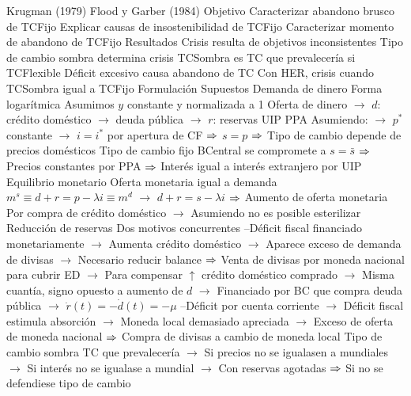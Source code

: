 \documentclass{nuevotema}
\begin{document}
\begin{esquemal}
				\4[] Krugman (1979)
				\4[] Flood y Garber (1984)
			\3 Objetivo
				\4 Caracterizar abandono brusco de TCFijo
				\4 Explicar causas de insostenibilidad de TCFijo
				\4 Caracterizar momento de abandono de TCFijo
			\3 Resultados
				\4 Crisis resulta de objetivos inconsistentes
				\4 Tipo de cambio sombra determina crisis
				\4[] TCSombra es TC que prevalecería si TCFlexible
				\4 Déficit excesivo causa abandono de TC
				\4 Con HER, crisis cuando TCSombra igual a TCFijo
		\2 Formulación
			\3 Supuestos
				\4 Demanda de dinero
				\4[] Forma logarítmica
				\4[] Asumimos $y$ constante y normalizada a 1
				\4[] 
				\4 Oferta de dinero
				\4[] 
				\4[] $\to$ $d$: crédito doméstico $\to$ deuda pública
				\4[] $\to$ $r$: reservas
				\4 UIP
				\4[] 
				\4 PPA
				\4[] 
				\4[] Asumiendo:
				\4[] $\to$ $p^*$ constante
				\4[] $\to$ $i = i^*$ por apertura de CF
				\4[] $\Rightarrow$ $s=p$
				\4[] $\Rightarrow$ Tipo de cambio depende de precios domésticos
				\4 Tipo de cambio fijo
				\4[] BCentral se compromete a $s = \bar{s}$
				\4[] $\Rightarrow$ Precios constantes por PPA
				\4[] $\Rightarrow$ Interés igual a interés extranjero por UIP
			\3 Equilibrio monetario
				\4 Oferta monetaria igual a demanda
				\4[] $m^s \equiv d + r = p - \lambda i \equiv m^d$
				\4[] $\to$ $d + r = s - \lambda i$
				\4[] $\Rightarrow$ 
				\4 Aumento de oferta monetaria
				\4[] Por compra de crédito doméstico
				\4[] $\to$ Asumiendo no es posible esterilizar
				\4 Reducción de reservas
				\4[] Dos motivos concurrentes
				\4[] --Déficit fiscal financiado monetariamente
				\4[] $\to$ Aumenta crédito doméstico
				\4[] $\to$ Aparece exceso de demanda de divisas
				\4[] $\to$ Necesario reducir balance
				\4[] $\Rightarrow$ Venta de divisas por moneda nacional para cubrir ED
				\4[] $\to$ Para compensar $\uparrow$ crédito doméstico comprado
				\4[] $\to$ Misma cuantía, signo opuesto a aumento de $d$
				\4[] $\to$ Financiado por BC que compra deuda pública
				\4[] $\to$ $\dot{r}(t) = -\dot{d}(t) = -\mu$
				\4[] --Déficit por cuenta corriente
				\4[] $\to$ Déficit fiscal estimula absorción
				\4[] $\to$ Moneda local demasiado apreciada
				\4[] $\to$ Exceso de oferta de moneda nacional
				\4[] $\Rightarrow$ Compra de divisas a cambio de moneda local
			\3 Tipo de cambio sombra
				\4 TC que prevalecería
				\4[] $\to$ Si precios no se igualasen a mundiales
				\4[] $\to$ Si interés no se igualase a mundial
				\4[] $\to$ Con reservas agotadas
				\4[] $\Rightarrow$ Si no se defendiese tipo de cambio

\end{esquemal}
\end{document}
